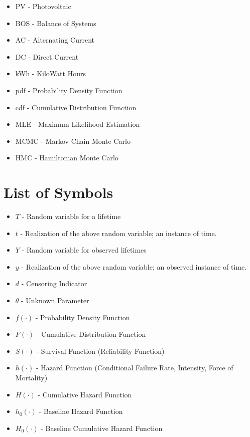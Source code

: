 \begin{itemize}

\item[] PV -  Photovoltaic
\item[] BOS - Balance of Systems
\item[] AC - Alternating Current
\item[] DC - Direct Current
\item[] kWh - KiloWatt Hours

\item[] pdf - Probability Density Function
\item[] cdf - Cumulative Distribution Function
\item[] MLE - Maximum Likelihood Estimation
\item[] MCMC - Markov Chain Monte Carlo
\item[] HMC - Hamiltonian Monte Carlo


\end{itemize}

\section*{List of Symbols}

\begin{itemize}

\item[] $T$ - Random variable for a lifetime
\item[] $t$ - Realization of the above random variable; an instance of time.
\item[] $Y$ - Random variable for observed lifetimes
\item[] $y$ - Realization of the above random variable; an observed instance of time.
\item[] $d$ - Censoring Indicator
\item[] $\theta$ - Unknown Parameter

\item[] $f(\cdot)$ - Probability Density Function
\item[] $F(\cdot)$ - Cumulative Distribution Function
\item[] $S(\cdot)$ - Survival Function (Reliability Function)
\item[] $h(\cdot)$ - Hazard Function (Conditional Failure Rate, Intensity, Force of Mortality)
\item[] $H(\cdot)$ - Cumulative Hazard Function
\item[] $h_0(\cdot)$ - Baseline Hazard Function
\item[] $H_0(\cdot)$ - Baseline Cumulative Hazard Function

\end{itemize}


